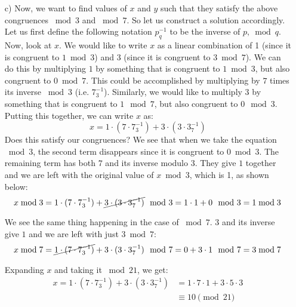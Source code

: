 \documentclass[]{article}
\begin{document}
\begin{qunlist}
{{\begin{enumerate}
\item[c)] Now, we want to find values of $x$ and $y$ such that they satisfy the above congruences $\bmod 3$ and $\bmod 7$. So let us construct a solution accordingly. Let us first define the following notation $p^{-1}_q$ to be the inverse of $p, \bmod q$.
Now, look at $x$. We would like to write $x$ as a linear combination of 1 (since it is congruent to $1 \bmod 3$) and 3 (since it is congruent to $3 \bmod 7$). We can do this by multiplying $1$ by something that is congruent to $1 \bmod 3$, but also congruent to $0 \bmod 7$. This could be accomplished by multiplying by $7$ times its inverse $\bmod 3$ (i.e. $7_3^{-1}$). Similarly, we would like to multiply $3$ by something that is congruent to $1 \mod 7$, but also congruent to $0 \mod 3$. Putting this together, we can write $x$ as:
\[
x = 1 \cdot (7 \cdot 7^{-1}_3) + 3 \cdot (3 \cdot 3^{-1}_7)
\]
Does this satisfy our congruences? We see that when we take the equation $\bmod 3$, the second term disappears since it is congruent to $0 \bmod 3$. The remaining term has both $7$ and its inverse modulo $3$. They give $1$ together and we are left with the original value of $x\bmod 3$, which is 1, as shown below:
\[ x \bmod 3 = 1 \cdot (7 \cdot 7^{-1}_3) + \cancel{3 \cdot (3 \cdot 3^{-1}_7)} \mod 3 = 1 \cdot 1 + 0 \mod 3 = 1 \bmod 3 \]

We see the same thing happening in the case of $\bmod 7$. $3$ and its inverse give $1$ and we are left with just $3\bmod 7$:
\[ x \bmod 7 = \cancel{1 \cdot (7 \cdot 7^{-1}_3)} + 3 \cdot (3 \cdot 3^{-1}_7) \mod 7 = 0 + 3 \cdot 1 \mod 7 = 3 \bmod 7 \]

Expanding $x$ and taking it $\bmod 21$, we get:
\begin{align*}
x = 1 \cdot (7 \cdot 7^{-1}_3) + 3 \cdot (3 \cdot 3^{-1}_7) &= 1 \cdot 7 \cdot 1 + 3 \cdot 5 \cdot 3 \\
&\equiv \boxed{10 \pmod {21}}
\end{align*}


\end{enumerate}}}
\end{qunlist}
\end{document}
